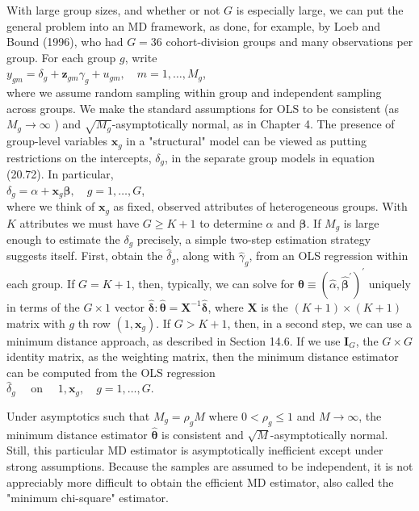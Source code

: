\documentclass[10pt]{article}
\begin{document}
With large group sizes, and whether or not $G$ is especially large, we can put the general problem into an MD framework, as done, for example, by Loeb and Bound (1996), who had $G=36$ cohort-division groups and many observations per group. For each group $g$, write\\
$y_{g m}=\delta_{g}+\mathbf{z}_{g m} \gamma_{g}+u_{g m}, \quad m=1, \ldots, M_{g}$,\\
where we assume random sampling within group and independent sampling across groups. We make the standard assumptions for OLS to be consistent (as $M_{g} \rightarrow \infty$ ) and $\sqrt{M_{g}}$-asymptotically normal, as in Chapter 4. The presence of group-level variables $\mathbf{x}_{g}$ in a "structural" model can be viewed as putting restrictions on the intercepts, $\delta_{g}$, in the separate group models in equation (20.72). In particular,\\
$\delta_{g}=\alpha+\mathbf{x}_{g} \boldsymbol{\beta}, \quad g=1, \ldots, G$,\\
where we think of $\mathbf{x}_{g}$ as fixed, observed attributes of heterogeneous groups. With $K$ attributes we must have $G \geq K+1$ to determine $\alpha$ and $\boldsymbol{\beta}$. If $M_{g}$ is large enough to estimate the $\delta_{g}$ precisely, a simple two-step estimation strategy suggests itself. First, obtain the $\hat{\delta}_{g}$, along with $\hat{\gamma}_{g}$, from an OLS regression within each group. If $G=K+1$, then, typically, we can solve for $\hat{\boldsymbol{\theta}} \equiv\left(\hat{\alpha}, \hat{\boldsymbol{\beta}}^{\prime}\right)^{\prime}$ uniquely in terms of the $G \times 1$ vector $\hat{\boldsymbol{\delta}}: \hat{\boldsymbol{\theta}}=\mathbf{X}^{-1} \hat{\boldsymbol{\delta}}$, where $\mathbf{X}$ is the $(K+1) \times(K+1)$ matrix with $g$ th row $\left(1, \mathbf{x}_{g}\right)$. If $G> K+1$, then, in a second step, we can use a minimum distance approach, as described in Section 14.6. If we use $\mathbf{I}_{G}$, the $G \times G$ identity matrix, as the weighting matrix, then the minimum distance estimator can be computed from the OLS regression\\
$\hat{\delta}_{g} \quad$ on $\quad 1, \mathbf{x}_{g}, \quad g=1, \ldots, G$.

Under asymptotics such that $M_{g}=\rho_{g} M$ where $0<\rho_{g} \leq 1$ and $M \rightarrow \infty$, the minimum distance estimator $\hat{\boldsymbol{\theta}}$ is consistent and $\sqrt{M}$-asymptotically normal. Still, this particular MD estimator is asymptotically inefficient except under strong assumptions. Because the samples are assumed to be independent, it is not appreciably more difficult to obtain the efficient MD estimator, also called the "minimum chi-square" estimator.
\end{document}
